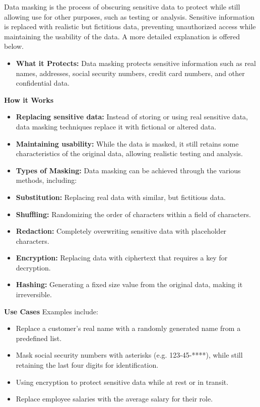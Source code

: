 Data masking is the process of obscuring sensitive data to protect while still allowing use for other purposes, such as testing or analysis. Sensitive information is replaced with realistic but fictitious data, preventing unauthorized access while maintaining the usability of the data. A more detailed explanation is offered below.
\begin{itemize}
    \item \textbf{What it Protects:} Data masking protects sensitive information such as real names, addresses, social security numbers, credit card numbers, and other confidential data.
\end{itemize}
\textbf{How it Works}
\begin{itemize}
    \item \textbf{Replacing sensitive data:} Instead of storing or using real sensitive data, data masking techniques replace it with fictional or altered data.
    \item \textbf{Maintaining usability:} While the data is masked, it still retains some characteristics of the original data, allowing realistic testing and analysis.
    \item \textbf{Types of Masking:}
    Data masking can be achieved through the various methods, including:
        \item \textbf{Substitution:} Replacing real data with similar, but fictitious data.
        \item \textbf{Shuffling:} Randomizing the order of characters within a field of characters.
        \item \textbf{Redaction:} Completely overwriting sensitive data with placeholder characters.
        \item \textbf{Encryption:} Replacing data with ciphertext that requires a key for decryption.
        \item \textbf{Hashing:} Generating a fixed size value from the original data, making it irreversible.
\end{itemize}
\textbf{Use Cases}
Examples include:
\begin{itemize}
    \item Replace a customer's real name with a randomly generated name from a predefined list.
    \item Mask social security numbers with asterisks (e.g. 123-45-****), while still retaining the last four digits for identification.
    \item Using encryption to protect sensitive data while at rest or in transit.
    \item Replace employee salaries with the average salary for their role.
\end{itemize}

